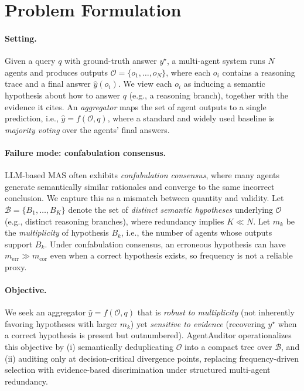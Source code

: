 \documentclass{article}
\theoremstyle{plain}
\theoremstyle{definition}
\theoremstyle{remark}
\begin{document}
 \section{Problem Formulation}
\label{sec:formal_setup}


\paragraph{Setting.}
Given a query $q$ with ground-truth answer $y^\star$, a multi-agent system runs $N$ agents and produces outputs
$\mathcal{O}=\{o_1,\ldots,o_N\}$, where each $o_i$ contains a reasoning trace and a final answer $\hat{y}(o_i)$.
We view each $o_i$ as inducing a semantic hypothesis about how to answer $q$ (e.g., a reasoning branch), together with the evidence it cites.
An \emph{aggregator} maps the set of agent outputs to a single prediction, i.e., $\hat{y}=f(\mathcal{O}, q)$, where a standard and widely used baseline is \emph{majority voting} over the agents’ final answers.

\paragraph{Failure mode: confabulation consensus.}
LLM-based MAS often exhibits \emph{confabulation consensus}, where many agents generate semantically similar rationales and converge to the same
incorrect conclusion. We capture this as a mismatch between quantity and validity.
Let $\mathcal{B}=\{B_1,\ldots,B_K\}$ denote the set of \emph{distinct semantic hypotheses} underlying $\mathcal{O}$ (e.g., distinct reasoning
branches), where redundancy implies $K \ll N$.
Let $m_k$ be the \emph{multiplicity} of hypothesis $B_k$, i.e., the number of agents whose outputs support $B_k$.
Under confabulation consensus, an erroneous hypothesis can have $m_{\mathrm{err}} \gg m_{\mathrm{cor}}$ even when a correct hypothesis exists, so frequency is not a reliable proxy. %


\paragraph{Objective.}
We seek an aggregator $\hat{y}=f(\mathcal{O}, q)$ that is \emph{robust to multiplicity} (not inherently favoring hypotheses with larger $m_k$) yet \emph{sensitive to evidence} (recovering $y^\star$ when a correct hypothesis is present but outnumbered). AgentAuditor operationalizes this objective by (i) semantically deduplicating $\mathcal{O}$ into a compact tree over $\mathcal{B}$, and (ii) auditing only at decision-critical divergence points, replacing frequency-driven selection with evidence-based discrimination under structured multi-agent redundancy.
\end{document}
